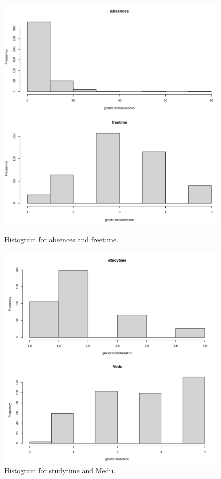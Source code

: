 \documentclass[a4paper]{article}
\begin{document}
\begin{figure}[H]
    \centering
    \begin{minipage}{0.5\textwidth}
        \centering
        \includegraphics[width = 1\linewidth]{Images/12.PNG}
        \caption{Histogram for absences and freetime.}
        \label{fig:hist6}
    \end{minipage}%
    \begin{minipage}{0.5\textwidth}
        \centering
        \includegraphics[width = 1.045\linewidth]{Images/15.PNG}
        \caption{Histogram for studytime and Medu.}
        \label{fig:hist8}
    \end{minipage}
\end{figure}
\end{document}
